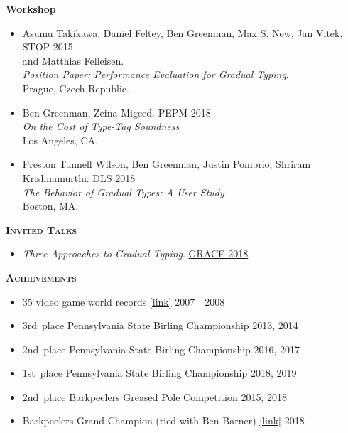 \documentclass{article}
\newcommand{\mysection}[1]{\vspace{0.5cm} \noindent\textsc{\textbf{#1}}~\hrulefill}
\newcommand{\mysubsection}[1]{\noindent\textbf{#1}}
\newcommand{\datespan}[2]{#1~\textendash{}~#2}
\begin{document}
\mysubsection{Workshop}
\begin{itemize}
\item
  Asumu Takikawa, Daniel Feltey, Ben Greenman, Max S. New, Jan Vitek, \hfill STOP 2015 \\
   and Matthias Felleisen. \\
   \emph{Position Paper: Performance Evaluation for Gradual Typing}. \\
  Prague, Czech Republic.
\item
  Ben Greenman, Zeina Migeed. \hfill PEPM 2018 \\
  \emph{On the Cost of Type-Tag Soundness} \\
  Los Angeles, CA.
\item
  Preston Tunnell Wilson, Ben Greenman, Justin Pombrio, Shriram Krishnamurthi. \hfill DLS 2018 \\
  \emph{The Behavior of Gradual Types: A User Study} \\
  Boston, MA.
\end{itemize}

\mysection{Invited Talks}
\begin{itemize}
  \item \emph{Three Approaches to Gradual Typing}. \hfill \href{https://2018.splashcon.org/track/grace-2018-papers}{GRACE 2018}
\end{itemize}

\mysection{Achievements}

\begin{itemize}
  \item 35 video game world records \href{https://www.twingalaxies.com/scores.php?player=43761}{[link]} \hfill \datespan{2007}{2008}
  \item 3rd~place Pennsylvania State Birling Championship \hfill 2013, 2014
  \item 2nd~place Pennsylvania State Birling Championship \hfill 2016, 2017
  \item 1st~place Pennsylvania State Birling Championship \hfill 2018, 2019
  \item 2nd~place Barkpeelers Greased Pole Competition \hfill 2015, 2018
  \item Barkpeelers Grand Champion (tied with Ben Barner) \href{http://lumbermuseum.org/bark-peeler-festival/festival-events-2019/bark-peeler-festival-2018/}{[link]} \hfill 2018
\end{itemize}
\end{document}
